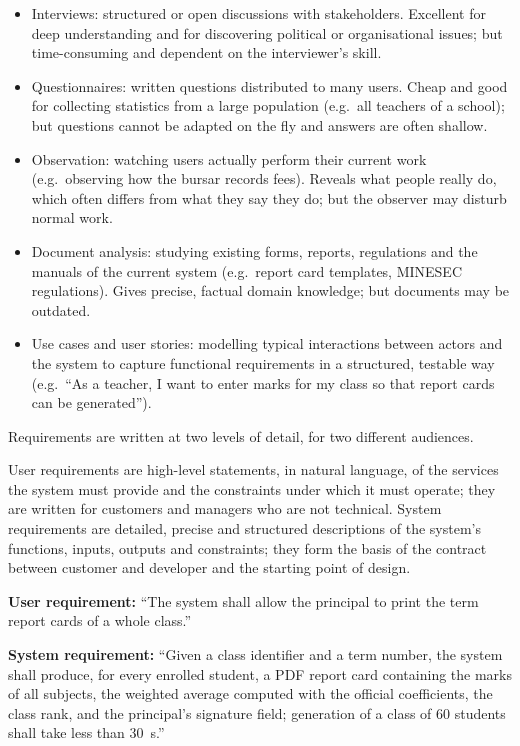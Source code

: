 \documentclass[11pt]{article}
\newcommand{\cle}[1]{{\popxbold\color{popdark}#1}}
\newcounter{popsec}
\newcounter{popsub}
\newcommand{\courssub}[1]{%
  \stepcounter{popsub}%
  \par\vspace{9pt}\noindent{\popxbold\fontsize{11.5}{13}\selectfont\color{popink}{\color{poporange}\thepopsec.\thepopsub}\hspace{6pt}#1}\par\nopagebreak\vspace{4pt}
}
\begin{document}
\begin{itemize}
\item \cle{Interviews}: structured or open discussions with stakeholders. Excellent for deep understanding and for discovering political or organisational issues; but time-consuming and dependent on the interviewer's skill.
\item \cle{Questionnaires}: written questions distributed to many users. Cheap and good for collecting statistics from a large population (e.g.\ all teachers of a school); but questions cannot be adapted on the fly and answers are often shallow.
\item \cle{Observation}: watching users actually perform their current work (e.g.\ observing how the bursar records fees). Reveals what people really do, which often differs from what they say they do; but the observer may disturb normal work.
\item \cle{Document analysis}: studying existing forms, reports, regulations and the manuals of the current system (e.g.\ report card templates, MINESEC regulations). Gives precise, factual domain knowledge; but documents may be outdated.
\item \cle{Use cases and user stories}: modelling typical interactions between actors and the system to capture functional requirements in a structured, testable way (e.g.\ ``As a teacher, I want to enter marks for my class so that report cards can be generated'').
\end{itemize}

\courssub{User Requirements and System Requirements}

Requirements are written at two levels of detail, for two different audiences.

\begin{definition}
\cle{User requirements} are high-level statements, in natural language, of the services the system must provide and the constraints under which it must operate; they are written for customers and managers who are not technical. \cle{System requirements} are detailed, precise and structured descriptions of the system's functions, inputs, outputs and constraints; they form the basis of the contract between customer and developer and the starting point of design.
\end{definition}

\begin{exemplebox}
\textbf{User requirement:} ``The system shall allow the principal to print the term report cards of a whole class.''\par
\textbf{System requirement:} ``Given a class identifier and a term number, the system shall produce, for every enrolled student, a PDF report card containing the marks of all subjects, the weighted average computed with the official coefficients, the class rank, and the principal's signature field; generation of a class of 60 students shall take less than \SI{30}{s}.''
\end{exemplebox}
\end{document}
